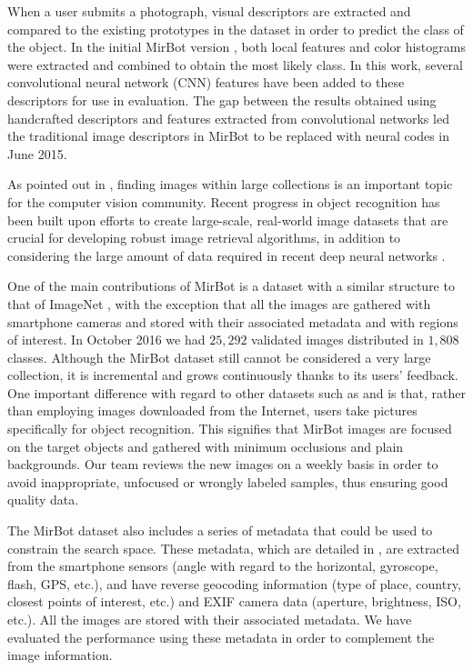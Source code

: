 \documentclass[final, twocolumn]{elsarticle}
\begin{document}
When a user submits a photograph, visual descriptors are extracted and compared to the existing prototypes in the dataset in order to predict the class of the object. In the initial MirBot version \cite{MirBot:System}, both local features and color histograms were extracted and combined to obtain the most likely class. In this work, several convolutional neural network (CNN) features have been added to these descriptors for use in evaluation. The gap between the results obtained using handcrafted descriptors and features extracted from convolutional networks led the traditional image descriptors in MirBot to be replaced with neural codes in June 2015.

As pointed out in \cite{Torralba200880Recognition.}, finding images within large collections is an important topic for the computer vision community. Recent progress in object recognition has been built upon efforts to create large-scale, real-world image datasets \citep{Khosla2012UndoingBias, Deng2009ImageNet:Database} that are crucial for developing robust image retrieval algorithms, in addition to considering the large amount of data required in recent deep neural networks \citep{LeCun2015DeepLearning}. 

One of the main contributions of MirBot is a dataset with a similar structure to that of ImageNet \citep{Deng2009ImageNet:Database}, with the exception that all the images are gathered with smartphone cameras and stored with their associated metadata and with regions of interest. In October 2016 we had $25,292$ validated images distributed in $1,808$ classes. Although the MirBot dataset still cannot be considered a very large collection, it is incremental and grows continuously thanks to its users' feedback. One important difference with regard to other datasets such as \cite{Torralba200880Recognition.} and \cite{Deng2009ImageNet:Database} is that, rather than employing images downloaded from the Internet, users take pictures specifically for object recognition. This signifies that MirBot images are focused on the target objects and gathered with minimum occlusions and plain backgrounds. Our team reviews the new images on a weekly basis in order to avoid inappropriate, unfocused or wrongly labeled samples, thus ensuring good quality data. 

The MirBot dataset also includes a series of metadata that could be used to constrain the search space. These metadata, which are detailed in \cite{MirBot:System}, are extracted from the smartphone sensors (angle with regard to the horizontal, gyroscope, flash, GPS, etc.), and have reverse geocoding information (type of place, country, closest points of interest, etc.) and EXIF camera data (aperture, brightness, ISO, etc.). All the images are stored with their associated metadata. We have evaluated the performance using these metadata in order to complement the image information.
\end{document}
